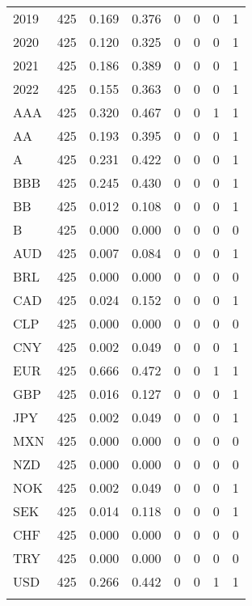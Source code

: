 \begin{table}[H]
\begin{tabular}{@{\extracolsep{5pt}}lccccccc}
2019 & 425 & 0.169 & 0.376 & 0 & 0 & 0 & 1 \\ 
2020 & 425 & 0.120 & 0.325 & 0 & 0 & 0 & 1 \\ 
2021 & 425 & 0.186 & 0.389 & 0 & 0 & 0 & 1 \\ 
2022 & 425 & 0.155 & 0.363 & 0 & 0 & 0 & 1 \\ 
AAA & 425 & 0.320 & 0.467 & 0 & 0 & 1 & 1 \\ 
AA & 425 & 0.193 & 0.395 & 0 & 0 & 0 & 1 \\ 
A & 425 & 0.231 & 0.422 & 0 & 0 & 0 & 1 \\ 
BBB & 425 & 0.245 & 0.430 & 0 & 0 & 0 & 1 \\ 
BB & 425 & 0.012 & 0.108 & 0 & 0 & 0 & 1 \\ 
B & 425 & 0.000 & 0.000 & 0 & 0 & 0 & 0 \\ 
AUD & 425 & 0.007 & 0.084 & 0 & 0 & 0 & 1 \\ 
BRL & 425 & 0.000 & 0.000 & 0 & 0 & 0 & 0 \\ 
CAD & 425 & 0.024 & 0.152 & 0 & 0 & 0 & 1 \\ 
CLP & 425 & 0.000 & 0.000 & 0 & 0 & 0 & 0 \\ 
CNY & 425 & 0.002 & 0.049 & 0 & 0 & 0 & 1 \\ 
EUR & 425 & 0.666 & 0.472 & 0 & 0 & 1 & 1 \\ 
GBP & 425 & 0.016 & 0.127 & 0 & 0 & 0 & 1 \\ 
JPY & 425 & 0.002 & 0.049 & 0 & 0 & 0 & 1 \\ 
MXN & 425 & 0.000 & 0.000 & 0 & 0 & 0 & 0 \\ 
NZD & 425 & 0.000 & 0.000 & 0 & 0 & 0 & 0 \\ 
NOK & 425 & 0.002 & 0.049 & 0 & 0 & 0 & 1 \\ 
SEK & 425 & 0.014 & 0.118 & 0 & 0 & 0 & 1 \\ 
CHF & 425 & 0.000 & 0.000 & 0 & 0 & 0 & 0 \\ 
TRY & 425 & 0.000 & 0.000 & 0 & 0 & 0 & 0 \\ 
USD & 425 & 0.266 & 0.442 & 0 & 0 & 1 & 1 \\ 
\hline \\[-1.8ex] 
\end{tabular} 
\end{table} 

\newpage

